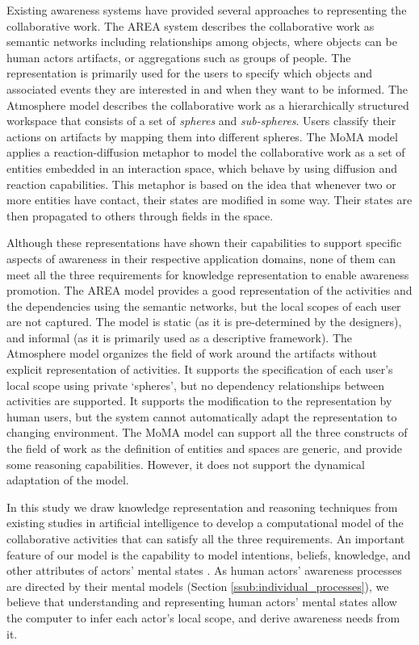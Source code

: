 Existing awareness systems have provided several approaches to representing the collaborative work. The AREA system \cite{fuchs1999a} describes the collaborative work as semantic networks including relationships among objects, where objects can be human actors artifacts, or aggregations such as groups of people. The representation is primarily used for the users to specify which objects and associated events they are interested in and when they want to be informed. The Atmosphere model \cite{Rittenbruch2002} describes the collaborative work as a hierarchically structured workspace that consists of a set of \emph{spheres} and \emph{sub-spheres}. Users classify their actions on artifacts by mapping them into different spheres. The MoMA model \cite{simone2002a} applies a reaction-diffusion metaphor to model the collaborative work as a set of entities embedded in an interaction space, which behave by using diffusion and reaction capabilities. This metaphor is based on the idea that whenever two or more entities have contact, their states are modified in some way. Their states are then propagated to others through fields in the space.  

Although these representations have shown their capabilities to support specific aspects of awareness in their respective application domains, none of them can meet all the three requirements for knowledge representation to enable awareness promotion. The AREA model provides a good representation of the activities and the dependencies using the semantic networks, but the local scopes of each user are not captured. The model is static (as it is pre-determined by the designers), and informal (as it is primarily used as a descriptive framework). The Atmosphere model organizes the field of work around the artifacts without explicit representation of activities. It supports the specification of each user's local scope using private `spheres', but no dependency relationships between activities are supported. It supports the modification to the representation by human users, but the system cannot automatically adapt the representation to changing environment. The MoMA model can support all the three constructs of the field of work as the definition of entities and spaces are generic, and provide some reasoning capabilities. However, it does not support the dynamical adaptation of the model.

In this study we draw knowledge representation and reasoning techniques from existing studies in artificial intelligence to develop a computational model of the collaborative activities that can satisfy all the three requirements. An important feature of our model is the capability to model intentions, beliefs, knowledge, and other attributes of actors' mental states \cite{grosz1996collaborative}. As human actors' awareness processes are directed by their mental models (Section \ref{ssub:individual_processes}), we believe that understanding and representing human actors' mental states allow the computer to infer each actor's local scope, and derive awareness needs from it. 

